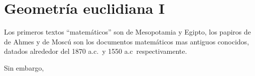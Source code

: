\chapter{Geometría euclidiana I} %
\label{cha:geometria_euclidiana_i}

 Los primeros
textos ``matemáticos'' son de Mesopotamia y Egipto, los papiros de de Ahmes y de
Moscú son los documentos matemáticos mas antiguos conocidos, datados alrededor
del 1870 a.c.\ y 1550 a.c\ respectivamente. 

Sin embargo, 



